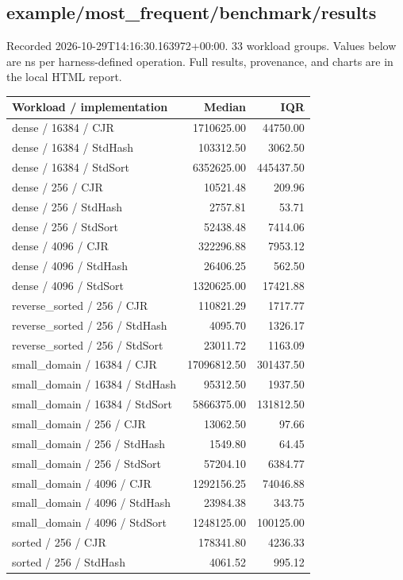\subsection{example/most\_frequent/benchmark/results}
Recorded 2026-10-29T14:16:30.163972+00:00. 33 workload groups. Values below are ns per harness-defined operation. Full results, provenance, and charts are in the local HTML report.
\begin{longtable}{p{}rr}Workload / implementation & Median & IQR \\ \hline
dense / 16384 / CJR & 1710625.00 & 44750.00 \\
dense / 16384 / StdHash & 103312.50 & 3062.50 \\
dense / 16384 / StdSort & 6352625.00 & 445437.50 \\
dense / 256 / CJR & 10521.48 & 209.96 \\
dense / 256 / StdHash & 2757.81 & 53.71 \\
dense / 256 / StdSort & 52438.48 & 7414.06 \\
dense / 4096 / CJR & 322296.88 & 7953.12 \\
dense / 4096 / StdHash & 26406.25 & 562.50 \\
dense / 4096 / StdSort & 1320625.00 & 17421.88 \\
reverse\_sorted / 256 / CJR & 110821.29 & 1717.77 \\
reverse\_sorted / 256 / StdHash & 4095.70 & 1326.17 \\
reverse\_sorted / 256 / StdSort & 23011.72 & 1163.09 \\
small\_domain / 16384 / CJR & 17096812.50 & 301437.50 \\
small\_domain / 16384 / StdHash & 95312.50 & 1937.50 \\
small\_domain / 16384 / StdSort & 5866375.00 & 131812.50 \\
small\_domain / 256 / CJR & 13062.50 & 97.66 \\
small\_domain / 256 / StdHash & 1549.80 & 64.45 \\
small\_domain / 256 / StdSort & 57204.10 & 6384.77 \\
small\_domain / 4096 / CJR & 1292156.25 & 74046.88 \\
small\_domain / 4096 / StdHash & 23984.38 & 343.75 \\
small\_domain / 4096 / StdSort & 1248125.00 & 100125.00 \\
sorted / 256 / CJR & 178341.80 & 4236.33 \\
sorted / 256 / StdHash & 4061.52 & 995.12 \\

\end{longtable}
